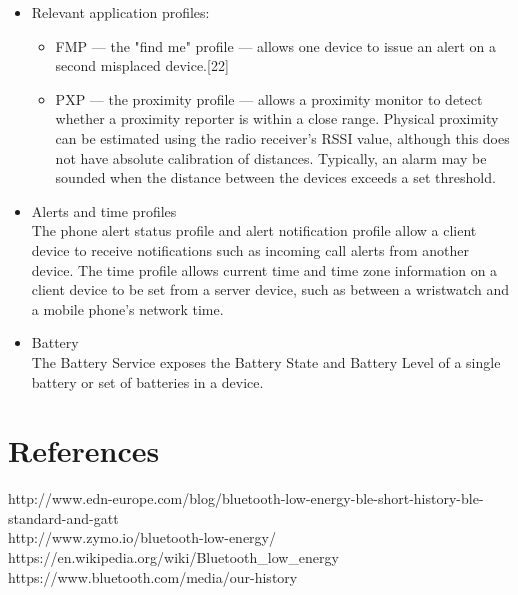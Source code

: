 \documentclass[11pt,a4paper]{article}
\begin{document}
{\begin{itemize}
\item Relevant application profiles:
\begin{itemize}
\item FMP — the "find me" profile — allows one device to issue an alert on a second misplaced device.[22]
\item PXP — the proximity profile — allows a proximity monitor to detect whether a proximity reporter is within a close range. Physical proximity can be estimated using the radio receiver's RSSI value, although this does not have absolute calibration of distances. Typically, an alarm may be sounded when the distance between the devices exceeds a set threshold.
\end{itemize}
\item Alerts and time profiles\\
The phone alert status profile and alert notification profile allow a client device to receive notifications such as incoming call alerts from another device.
The time profile allows current time and time zone information on a client device to be set from a server device, such as between a wristwatch and a mobile phone's network time.
\item Battery\\
The Battery Service exposes the Battery State and Battery Level of a single battery or set of batteries in a device.
\end{itemize}
	}
    \newpage
	\section{ References}
	{
	http://www.edn-europe.com/blog/bluetooth-low-energy-ble-short-history-ble-standard-and-gatt\\
	http://www.zymo.io/bluetooth-low-energy/\\
	https://en.wikipedia.org/wiki/Bluetooth_low_energy\\
	https://www.bluetooth.com/media/our-history\\
	}

	
\end{document}
